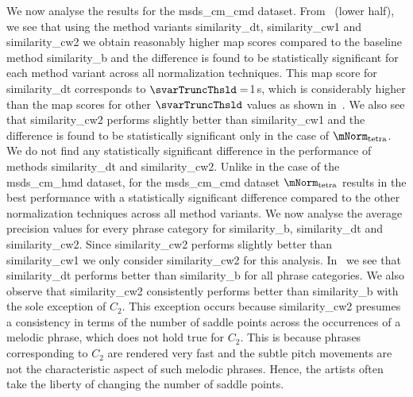 We now analyse the results for the \acrshort{msds_cm_cmd} dataset. From~ (lower half), we see that using the method variants \acrshort{similarity_dt}, \acrshort{similarity_cw1} and \acrshort{similarity_cw2} we obtain reasonably higher \gls{map} scores compared to the baseline method \acrshort{similarity_b} and the difference is found to be statistically significant for each method variant across all normalization techniques. This \gls{map} score for \acrshort{similarity_dt} corresponds to $\svarTruncThsld=$1\,s, which is considerably higher than the \gls{map} scores for other $\svarTruncThsld$ values as shown in~. We also see that \acrshort{similarity_cw2} performs slightly better than \acrshort{similarity_cw1} and the difference is found to be statistically significant only in the case of $\mNorm_\mathrm{tetra}$. We do not find any statistically significant difference in the performance of methods \acrshort{similarity_dt} and \acrshort{similarity_cw2}. Unlike in the case of the \acrshort{msds_cm_hmd} dataset, for the \acrshort{msds_cm_cmd} dataset $\mNorm_\mathrm{tetra}$ results in the best performance with a statistically significant difference compared to the other normalization techniques across all method variants. We now analyse the average precision values for every phrase category for \acrshort{similarity_b}, \acrshort{similarity_dt} and \acrshort{similarity_cw2}. Since \acrshort{similarity_cw2} performs slightly better than \acrshort{similarity_cw1} we only consider \acrshort{similarity_cw2} for this analysis. In~ we see that \acrshort{similarity_dt} performs better than \acrshort{similarity_b} for all phrase categories.  We also observe that \acrshort{similarity_cw2} consistently performs better than \acrshort{similarity_b} with the sole exception of $C_2$. This exception occurs because \acrshort{similarity_cw2} presumes a consistency in terms of the number of saddle points across the occurrences of a melodic phrase, which does not hold true for $C_2$. This is because phrases corresponding to $C_2$ are rendered very fast and the subtle pitch movements are not the characteristic aspect of such melodic phrases. Hence, the artists often take the liberty of changing the number of saddle points. 

